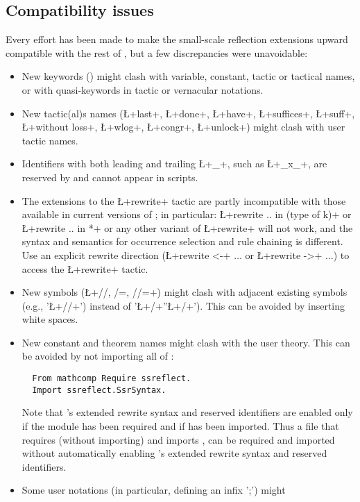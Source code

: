 \subsection{Compatibility issues}\label{sec:compat}
Every effort has been made to make the small-scale reflection
extensions upward compatible with the rest of \Coq{}, but a few
discrepancies were unavoidable:
\begin{itemize}
\item New keywords () might clash with variable, constant,
tactic or tactical names, or with quasi-keywords in tactic or
vernacular notations.
\item New tactic(al)s names (\L+last+, \L+done+, \L+have+,
  \L+suffices+, \L+suff+,
  \L+without loss+, \L+wlog+, \L+congr+, \L+unlock+) might clash
  with user tactic names.
\item Identifiers with both leading and trailing \L+_+, such as \L+_x_+,
are reserved by \ssr{} and cannot appear in scripts.
\item The extensions to the \L+rewrite+ tactic are partly
incompatible with those available in current versions of \Coq{};
in particular:
\L+rewrite .. in (type of k)+ or \\ \L+rewrite .. in *+ or any other
variant of \L+rewrite+ will not work, and the \ssr{} syntax and semantics for occurrence selection and
rule chaining is different.
Use an explicit rewrite direction (\L+rewrite <-+ $\dots$ or \L+rewrite ->+ $\dots$)
to access the \Coq{} \L+rewrite+ tactic.
\item New symbols (\L+//, /=, //=+) might clash with adjacent existing
  symbols (e.g., '\L+//+') instead of '\L+/+''\L+/+'). This can be avoided
  by inserting white spaces.
\item New constant and theorem names might clash with the user
theory. This can be avoided by not importing all of \ssr{}:
\begin{lstlisting}
  From mathcomp Require ssreflect.
  Import ssreflect.SsrSyntax.
\end{lstlisting}
Note that \ssr{}'s extended rewrite syntax and reserved identifiers are
enabled only if the  module has been required and if
 has been imported. Thus a file that requires (without importing)
  and imports , can be
required and imported without automatically enabling \ssr{}'s
extended rewrite syntax and reserved identifiers.
\item Some user notations (in particular, defining an infix ';') might

\end{itemize}
